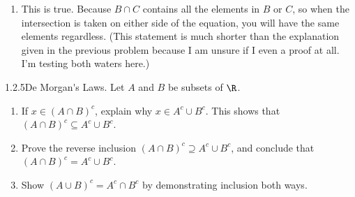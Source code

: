 {\begin{enumerate}
\begin{enumerate}[label=(\arabic*)]
            \begin{enumerate}[label=\roman*.]
                \item \textbf{If the set inside the parenthesis is not empty}, then we have $y$ and $z \in B \cap C$. Then it could be the case that $y$ and $z \in A$. From this, we know 2 things can occur. Either every set contains only $y$, or $y$ and $z$.
                \item \textbf{If the set inside the parenthesis is empty}, then the resulting intersection with $A$ would be the empty set.
            \end{enumerate}
            \item In every case, either we get the empty set, or end up in a situation where every set contains just $y$ or all elements. Hence, the two sides of the equation will always equal each other. 
        \end{enumerate}
        \item This is true. Because $B \cap C$ contains all the elements in $B$ or $C$, so when the intersection is taken on either side of the equation, you will have the same elements regardless. (This statement is much shorter than the explanation given in the previous problem because I am unsure if I even a proof at all. I'm testing both waters here.) 
    \end{enumerate}
}

\newpage
\begin{exercise}
    {1.2.5}\Gls{De Morgan's Laws}. Let $A$ and $B$ be subsets of $\R$.
    \begin{enumerate}
        \item  If $x \in (A \cap B)^c$, explain why $x \in A^c \cup B^c$. This shows that $(A \cap B)^c \subseteq A^c \cup B^c$.
        \item Prove the reverse inclusion $(A \cap B)^c \supseteq A^c \cup B^c$, and conclude that $(A \cap B)^c = A^c \cup B^c$.
        \item Show $(A \cup B)^c = A^c \cap B^c$ by demonstrating inclusion both ways.
    \end{enumerate}
\end{exercise}

